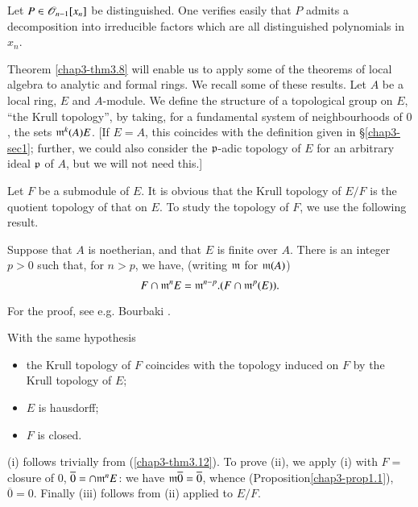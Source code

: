 \begin{remark}\label{chap3-rem3.11}
Let $P\in \mathscr{O}_{n-1}[x_{n}]$ be distinguished. One verifies easily that $P$ admits a decomposition into irreducible factors which are all distinguished polynomials in $x_{n}$.
\end{remark}

Theorem \ref{chap3-thm3.8} will enable us to apply some of the theorems of local algebra to analytic and formal rings. We recall some of these results. Let $A$ be a local ring, $E$ and $A$-module. We define the structure of a topological group on $E$, ``the Krull topology'', by taking, for a fundamental system of neighbourhoods of $0$, the sets $\mathfrak{m}^{k}(A)E$. [If $E=A$, this coincides with the definition given in \S\ref{chap3-sec1}; further, we could also consider the $\mathfrak{p}$-adic topology of $E$ for an arbitrary ideal $\mathfrak{p}$ of $A$, but we will not need this.]

Let $F$ be a submodule of $E$. It is obvious that the Krull topology of $E/F$ is the quotient topology of that on $E$. To study the topology of $F$, we use the following result.

\begin{theorem}\label{chap3-thm3.12}
Suppose that $A$ is noetherian, and that $E$ is finite over $A$. There is an integer $p>0$ such that, for $n>p$, we have, (writing $\mathfrak{m}$ for $\mathfrak{m}(A)$)
$$
F\cap \mathfrak{m}^{n}E=\mathfrak{m}^{n-p}.(F\cap \mathfrak{m}^{p}(E)).
$$
\end{theorem}

For the proof, see e.g. Bourbaki \cite{N. Bourbaki: 2}.
\begin{corollary}[Krull]\label{chap3-coro3.13}
With the same hypothesis
\begin{itemize}
\item[\rm(i)] the Krull topology of $F$ coincides with the topology induced on $F$ by the Krull topology of $E$;

\item[\rm(ii)] $E$ is hausdorff;

\item[\rm(iii)] $F$ is closed.
\end{itemize}
\end{corollary}
(i) follows trivially from (\ref{chap3-thm3.12}). To prove (ii), we apply (i) with $F=$ closure of $0$, $\overline{0}=\cap \mathfrak{m}^{n}E$: we have $\mathfrak{m}\overline{0}=\overline{0}$, whence (Proposition\pageoriginale \ref{chap3-prop1.1}), $\overline{0}=0$. Finally (iii) follows from (ii) applied to $E/F$.

